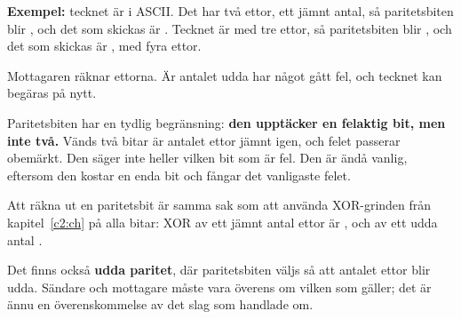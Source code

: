 \textbf{Exempel:} tecknet  är  i ASCII. Det har två ettor, ett jämnt antal,
så paritetsbiten blir , och det som skickas är . Tecknet  är
 med tre ettor, så paritetsbiten blir , och det som skickas är
, med fyra ettor.

Mottagaren räknar ettorna. Är antalet udda har något gått fel, och tecknet kan begäras på nytt.

Paritetsbiten har en tydlig begränsning: \textbf{den upptäcker en felaktig bit, men inte två.}
Vänds två bitar är antalet ettor jämnt igen, och felet passerar obemärkt. Den säger inte heller
vilken bit som är fel. Den är ändå vanlig, eftersom den kostar en enda bit och fångar det
vanligaste felet.

Att räkna ut en paritetsbit är samma sak som att använda XOR-grinden från kapitel~\ref{c2:ch} på
alla bitar: XOR av ett jämnt antal ettor är , och av ett udda antal .

Det finns också \textbf{udda paritet}, där paritetsbiten väljs så att antalet ettor blir udda.
Sändare och mottagare måste vara överens om vilken som gäller; det är ännu en överenskommelse av det
slag som  handlade om.
